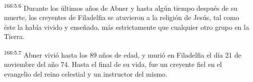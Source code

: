 \par 
\textsuperscript{166:5.6} Durante los últimos años de Abner y hasta algún tiempo después de su muerte, los creyentes de Filadelfia se atuvieron a la religión de Jesús, tal como éste la había vivido y enseñado, más estrictamente que cualquier otro grupo en la Tierra.

\par 
\textsuperscript{166:5.7} Abner vivió hasta los 89 años de edad, y murió en Filadelfia el día 21 de noviembre del año 74. Hasta el final de su vida, fue un creyente fiel en el evangelio del reino celestial y un instructor del mismo.
